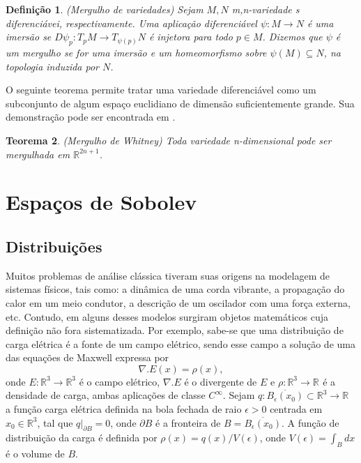 \documentclass[12pt]{book}
\newtheorem{teorema}{Teorema}[section]
\newtheorem{definicao}[teorema]{Definição}
\newcommand{\real}[1]{\mathbb{R}^{#1}}
\newcommand{\reta}{\real{}}
\begin{document}
	\begin{definicao}\label{definicao_mergulho_variedades}
			(Mergulho de variedades) Sejam $M, N$ m,n-variedade s diferenciávei, respectivamente. Uma aplicação diferenciável $\psi:M\to N$ é uma imersão se $D\psi_{p}:T_{p}M\to T_{\psi(p)}N$ é injetora para todo $p \in M$. Dizemos que $\psi$ é um mergulho se for uma imersão e um homeomorfismo sobre $\psi(M) \subseteq N$, na topologia induzida por $N$. 
	\end{definicao}
	
	O seguinte teorema permite tratar uma variedade diferenciável como um subconjunto de algum espaço euclidiano de dimensão suficientemente grande. Sua demonstração pode ser encontrada em \cite{guillemin_differential_topology}.
	
	\begin{teorema}\label{teorema_whitney}
			(Mergulho de Whitney) Toda variedade n-dimensional pode ser mergulhada em $\real{2n+1}$.
	\end{teorema}
	
	
	\chapter{Espaços de Sobolev}
	\section{Distribuições}\label{secao_distribuicoes}
	Muitos problemas de análise clássica tiveram suas origens na modelagem de sistemas físicos, tais como: a dinâmica de uma corda vibrante, a propagação do calor em um meio condutor, a descrição de um oscilador com uma força externa, etc. Contudo, em alguns desses modelos surgiram objetos matemáticos cuja definição não fora sistematizada. Por exemplo, sabe-se que uma distribuição de carga elétrica é a fonte de um campo elétrico, sendo esse campo a solução de uma das equações de Maxwell expressa por
	$$
	\nabla.E(x) = \rho(x),
	$$
	onde $E:\real{3} \to \real{3} $ é o campo elétrico, $\nabla.E$ é o divergente de $E$ e $\rho:\real{3}\to \reta$ é a densidade de carga, ambas aplicações de classe $C^{\infty}$. Sejam $q:\overline{B_{\epsilon}(x_{0})} \subset \real{3}\to \reta$ a função carga elétrica definida na bola fechada de raio $\epsilon>0$ centrada em $x_{0}\in \real{3}$, tal que $q|_{\partial B} = 0$, onde $\partial B$ é a fronteira de $B=\overline{B_{\epsilon}(x_{0})}$. A função de distribuição da carga é definida por $\rho(x)=q(x)/V(\epsilon)$, onde $V(\epsilon)=\int_{B}dx$ é o volume de $B$.
	
\end{document}
